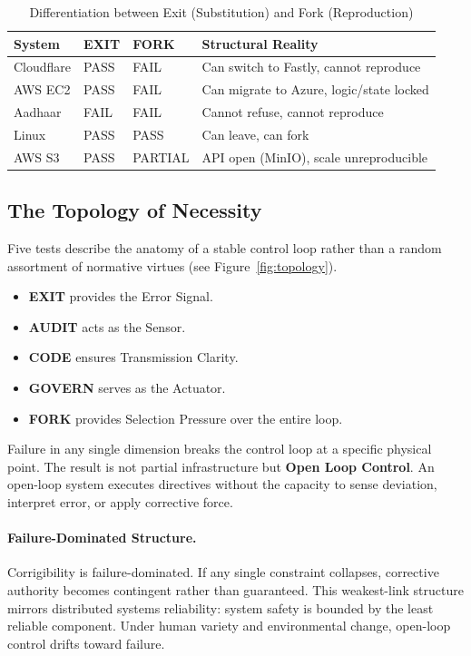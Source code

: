 \documentclass{article}
\begin{document}
\begin{table}[htbp]
\centering
\begin{tabular}{@{}lllp{5.5cm}@{}}
\toprule
\textbf{System} & \textbf{EXIT} & \textbf{FORK} & \textbf{Structural Reality} \\
\midrule
Cloudflare & PASS & FAIL & Can switch to Fastly, cannot reproduce \\
AWS EC2 & PASS & FAIL & Can migrate to Azure, logic/state locked \\
Aadhaar & FAIL & FAIL & Cannot refuse, cannot reproduce \\
Linux & PASS & PASS & Can leave, can fork \\
AWS S3 & PASS & PARTIAL & API open (MinIO), scale unreproducible \\
\bottomrule
\end{tabular}
\caption{Differentiation between Exit (Substitution) and Fork (Reproduction)}
\end{table}

\subsection{The Topology of Necessity}

Five tests describe the anatomy of a stable control loop rather than a random assortment of normative virtues (see Figure~\ref{fig:topology}).

\begin{itemize}[noitemsep,topsep=0pt]
    \item \textbf{EXIT} provides the Error Signal.
    \item \textbf{AUDIT} acts as the Sensor.
    \item \textbf{CODE} ensures Transmission Clarity.
    \item \textbf{GOVERN} serves as the Actuator.
    \item \textbf{FORK} provides Selection Pressure over the entire loop.
\end{itemize}

Failure in any single dimension breaks the control loop at a specific physical point. The result is not partial infrastructure but \textbf{Open Loop Control}. An open-loop system executes directives without the capacity to sense deviation, interpret error, or apply corrective force.

\paragraph{Failure-Dominated Structure.} Corrigibility is failure-dominated. If any single constraint collapses, corrective authority becomes contingent rather than guaranteed. This weakest-link structure mirrors distributed systems reliability: system safety is bounded by the least reliable component. Under human variety and environmental change, open-loop control drifts toward failure.
\end{document}
